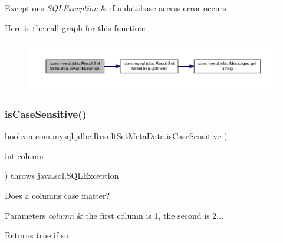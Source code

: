 \begin{DoxyExceptions}{Exceptions}
{\em S\+Q\+L\+Exception} & if a database access error occurs \\
\hline
\end{DoxyExceptions}
Here is the call graph for this function\+:
\nopagebreak
\begin{figure}[H]
\begin{center}
\leavevmode
\includegraphics[width=350pt]{classcom_1_1mysql_1_1jdbc_1_1_result_set_meta_data_a41595c3fea85831fc2350ef5041bf489_cgraph}
\end{center}
\end{figure}
\mbox{\label{classcom_1_1mysql_1_1jdbc_1_1_result_set_meta_data_a34d591e0699ad43b0ce73806856460d0}} 
\subsubsection{\texorpdfstring{is\+Case\+Sensitive()}{isCaseSensitive()}}
{\footnotesize\ttfamily boolean com.\+mysql.\+jdbc.\+Result\+Set\+Meta\+Data.\+is\+Case\+Sensitive (\begin{DoxyParamCaption}\item[{int}]{column }\end{DoxyParamCaption}) throws java.\+sql.\+S\+Q\+L\+Exception}

Does a column\textquotesingle{}s case matter?


\begin{DoxyParams}{Parameters}
{\em column} & the first column is 1, the second is 2...\\
\hline
\end{DoxyParams}
\begin{DoxyReturn}{Returns}
true if so
\end{DoxyReturn}

